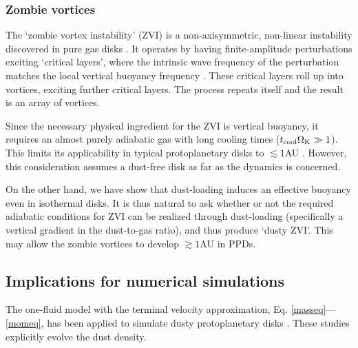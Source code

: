 


\subsubsection{Zombie vortices}

The `zombie vortex instability' (ZVI) is a non-axisymmetric,
non-linear instability discovered in pure gas disks
\citep{marcus15,umurhan16d}. It operates by having finite-amplitude perturbations
exciting `critical layers',  where the intrinsic wave frequency of the
perturbation matches the local vertical buoyancy frequency 
\citep{marcus13}. These critical layers roll 
up into vortices, exciting further critical layers. The process
repeats itself and the result is an array of vortices. 

Since the necessary physical ingredient for the ZVI is vertical
buoyancy, it requires an almost purely adiabatic gas with long cooling times ($t_\mathrm{cool}\Omega_{\rm K}\gg
1$). This limits its applicability in typical protoplanetary disks to 
$\lesssim 1$AU \citep{lesur16, malygin17}. However, this consideration
assumes a dust-free disk as far as the dynamics is concerned. 

On the other hand, we have show that dust-loading induces an effective
buoyancy even in isothermal disks. It is thus natural to ask whether or not
the required adiabatic conditions for ZVI can be realized through
dust-loading (specifically a vertical gradient in the dust-to-gas ratio), 
and thus produce `dusty ZVI'. This may allow the zombie 
vortices to develop $\gtrsim 1$AU in PPDs. 

\subsection{Implications for numerical simulations}\label{dust_sims}
{ The one-fluid model with the terminal velocity approximation, Eq. \ref{masseq}---\ref{momeq}, 
has been applied to simulate dusty protoplanetary disks \citep{dipierro15,ragusa17}. These studies 
explicitly evolve the dust density.  
}

